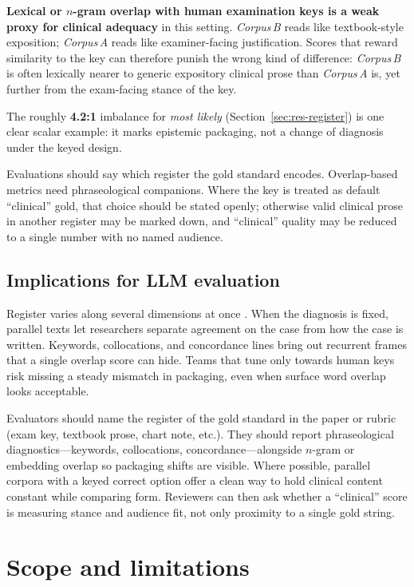 \documentclass[11pt,a4paper]{article}
\newcommand{\CA}{\emph{Corpus\,A}}
\newcommand{\CB}{\emph{Corpus\,B}}
\begin{document}
\textbf{Lexical or $n$-gram overlap with human examination keys is a weak proxy for clinical adequacy} in this setting. \CB{} reads like textbook-style exposition; \CA{} reads like examiner-facing justification. Scores that reward similarity to the key can therefore punish the wrong kind of difference: \CB{} is often lexically nearer to generic expository clinical prose than \CA{} is, yet further from the exam-facing stance of the key.

The roughly \textbf{4.2{:}1} imbalance for \emph{most likely} (Section~\ref{sec:res-register}) is one clear scalar example: it marks epistemic packaging, not a change of diagnosis under the keyed design.

Evaluations should say which register the gold standard encodes. Overlap-based metrics need phraseological companions. Where the key is treated as default ``clinical'' gold, that choice should be stated openly; otherwise valid clinical prose in another register may be marked down, and ``clinical'' quality may be reduced to a single number with no named audience.

\subsection{Implications for LLM evaluation}

Register varies along several dimensions at once \cite{biber1995,ferguson1983}. When the diagnosis is fixed, parallel texts let researchers separate agreement on the case from how the case is written. Keywords, collocations, and concordance lines bring out recurrent frames that a single overlap score can hide. Teams that tune only towards human keys risk missing a steady mismatch in packaging, even when surface word overlap looks acceptable.

Evaluators should name the register of the gold standard in the paper or rubric (exam key, textbook prose, chart note, etc.). They should report phraseological diagnostics---keywords, collocations, concordance---alongside $n$-gram or embedding overlap so packaging shifts are visible. Where possible, parallel corpora with a keyed correct option offer a clean way to hold clinical content constant while comparing form. Reviewers can then ask whether a ``clinical'' score is measuring stance and audience fit, not only proximity to a single gold string.
\FloatBarrier

\section{Scope and limitations}
\end{document}
